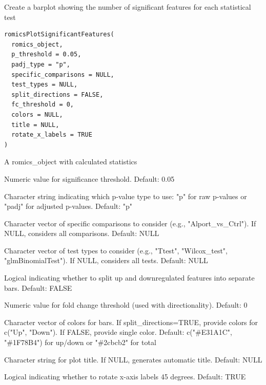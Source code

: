 \documentclass[a4paper]{book}
\begin{document}
%
\begin{Description}
Create a barplot showing the number of significant features for each statistical test
\end{Description}
%
\begin{Usage}
\begin{verbatim}
romicsPlotSignificantFeatures(
  romics_object,
  p_threshold = 0.05,
  padj_type = "p",
  specific_comparisons = NULL,
  test_types = NULL,
  split_directions = FALSE,
  fc_threshold = 0,
  colors = NULL,
  title = NULL,
  rotate_x_labels = TRUE
)
\end{verbatim}
\end{Usage}
%
\begin{Arguments}
\begin{ldescription}
\item[\code{romics\_object}] A romics\_object with calculated statistics

\item[\code{p\_threshold}] Numeric value for significance threshold. Default: 0.05

\item[\code{padj\_type}] Character string indicating which p-value type to use: "p" for raw p-values or "padj" for adjusted p-values. Default: "p"

\item[\code{specific\_comparisons}] Character vector of specific comparisons to consider (e.g., "Alport\_vs\_Ctrl"). If NULL, considers all comparisons. Default: NULL

\item[\code{test\_types}] Character vector of test types to consider (e.g., "Ttest", "Wilcox\_test", "glmBinomialTest"). If NULL, considers all tests. Default: NULL

\item[\code{split\_directions}] Logical indicating whether to split up and downregulated features into separate bars. Default: FALSE

\item[\code{fc\_threshold}] Numeric value for fold change threshold (used with directionality). Default: 0

\item[\code{colors}] Character vector of colors for bars. If split\_directions=TRUE, provide colors for c("Up", "Down"). If FALSE, provide single color. Default: c("\#E31A1C", "\#1F78B4") for up/down or "\#2cbcb2" for total

\item[\code{title}] Character string for plot title. If NULL, generates automatic title. Default: NULL

\item[\code{rotate\_x\_labels}] Logical indicating whether to rotate x-axis labels 45 degrees. Default: TRUE
\end{ldescription}
\end{Arguments}
\end{document}
